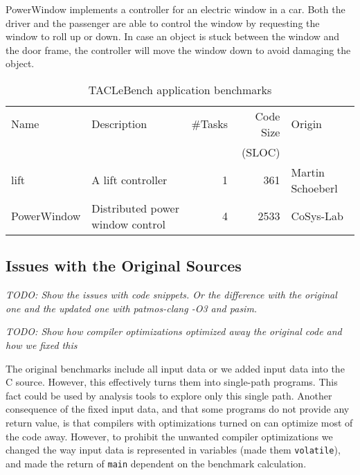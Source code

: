 \documentclass[a4paper,UKenglish]{oasics}
\newcommand{\todo}[1]{{\emph{TODO: #1}}}
\newcommand{\code}[1]{{\small{\texttt{#1}}}}
\begin{document}
PowerWindow implements a controller for an electric window in a car.
Both the driver and the passenger are able to control the window by 
requesting the window to roll up or down.
In case an object is stuck between the window and the door frame,
the controller will move the window down to avoid damaging the object.

\begin{table}
\centering
\caption{\label{tab:bench_app}TACLeBench application benchmarks}
\begin{tabular}{lL{5cm}rrR{2cm}}
\toprule
Name & Description & \#Tasks & Code Size & Origin\\

     &             &         &     (SLOC) & \\ \midrule
lift & A lift controller & 1 & 361 & Martin Schoeberl\\
PowerWindow & Distributed power window control & 4 & 2533 & CoSys-Lab \\
\bottomrule
\end{tabular}
\end{table}

\subsection{Issues with the Original Sources}


\todo{Show the issues with code snippets. Or the difference with the original one
and the updated one with patmos-clang -O3 and pasim.}

\todo{Show how compiler optimizations optimized away the original code and how we fixed this}

The original benchmarks include all input data or we added input data into the C source.
However, this effectively turns them into single-path programs.
This fact could be used by analysis tools to explore only this single path.
Another consequence of the fixed
input data, and that some programs do not provide
any return value, is that compilers with optimizations turned on can optimize
most of the code away.
However, to prohibit the unwanted compiler optimizations we changed
the way input data is represented in variables (made them \code{volatile}),
and made the return of \code{main} dependent on the benchmark calculation.

\end{document}
